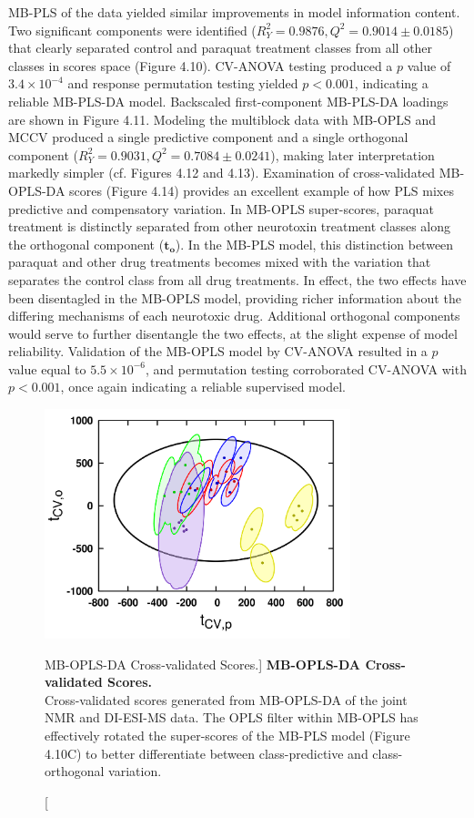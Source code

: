 \begin{doublespace}
MB-PLS of the data yielded similar improvements in model information content.
Two significant components were identified
($R^2_Y = 0.9876, Q^2 = 0.9014 \pm 0.0185$) that clearly separated control and
paraquat treatment classes from all other classes in scores space
(Figure 4.10). CV-ANOVA testing produced a $p$ value of $3.4 \times 10^{-4}$
and response permutation testing yielded $p < 0.001$, indicating a reliable
MB-PLS-DA model. Backscaled first-component MB-PLS-DA loadings are shown in
Figure 4.11. Modeling the multiblock data with MB-OPLS and MCCV produced a
single predictive component and a single orthogonal component
($R^2_Y = 0.9031, Q^2 = 0.7084 \pm 0.0241$), making later interpretation
markedly simpler (cf. Figures 4.12 and 4.13). Examination of cross-validated
MB-OPLS-DA scores (Figure 4.14) provides an excellent example of how PLS mixes
predictive and compensatory variation. In MB-OPLS super-scores, paraquat
treatment is distinctly separated from other neurotoxin treatment classes along
the orthogonal component ($\mathbf{t_o}$). In the MB-PLS model, this
distinction between paraquat and other drug treatments becomes mixed with the
variation that separates the control class from all drug treatments. In effect,
the two effects have been disentagled in the MB-OPLS model, providing richer
information about the differing mechanisms of each neurotoxic drug. Additional
orthogonal components would serve to further disentangle the two effects, at
the slight expense of model reliability. Validation of the MB-OPLS model by
CV-ANOVA resulted in a $p$ value equal to $5.5 \times 10^{-6}$, and permutation
testing corroborated CV-ANOVA with $p < 0.001$, once again indicating a
reliable supervised model.
\end{doublespace}

\begin{figure}
\includegraphics[width=3.5in]{figs/apps/14-mbopls-t.png}
\caption
      [MB-OPLS-DA Cross-validated Scores.]{
  {\bf MB-OPLS-DA Cross-validated Scores.}
  \\
  Cross-validated scores generated from MB-OPLS-DA of the joint \hnmr{} NMR
  and DI-ESI-MS data. The OPLS filter within MB-OPLS has effectively rotated
  the super-scores of the MB-PLS model (Figure 4.10C) to better differentiate
  between class-predictive and class-orthogonal variation.
}
\end{figure}

